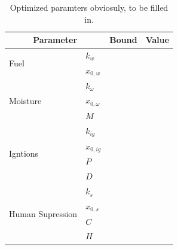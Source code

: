 \begin{table}[]
\centering
\caption{Optimized paramters obviosuly, to be filled in.}
\label{tab:optimize}
\begin{tabular}{llll}
\hline
\multicolumn{2}{c}{\textbf{Parameter}} & \multicolumn{1}{c}{\textbf{Bound}} & \multicolumn{1}{c}{\textbf{Value}} \\ \hline
\multirow{2}{*}{Fuel}             & $k_{w}$         &                                    &                                    \\
                                  & $x_{0,w}$       &                                    &                                    \\ \hline
\multirow{3}{*}{Moisture}         & $k_{\omega}$    &                                    &                                    \\
                                  & $x_{0, \omega}$ &                                    &                                    \\
                                  & $M$             &                                    &                                    \\ \hline
\multirow{4}{*}{Igntions}         & $k_{ig}$        &                                    &                                    \\
                                  & $x_{0, ig}$     &                                    &                                    \\
                                  & $P$             &                                    &                                    \\
                                  & $D$             &                                    &                                    \\ \hline
\multirow{4}{*}{Human Supression} & $k_{s}$         &                                    &                                    \\
                                  & $x_{0, s}$      &                                    &                                    \\
                                  & $C$             &                                    &                                    \\
                                  & $H$             &                                    &                                    \\ \hline
\end{tabular}
\end{table}


